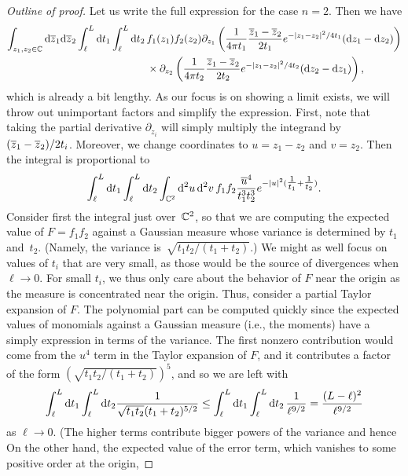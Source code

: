 \begin{proof}[Outline of proof]
Let us write the full expression for the case $n=2$.
Then we have
\begin{align*}
\int_{z_1,z_2 \in \mathbb C} {\rm d}\overline{z}_1{\rm d}\overline{z}_2 \int_{\ell}^L {\rm d} t_1 \int_{\ell}^L {\rm d} t_2\, 
& f_1(z_1)f_2(z_2) 
\partial_{z_1} \left(\frac{1}{4\pi t_1} \frac{\overline{z}_1 - \overline{z}_2}{2t_1} e^{-|z_1-z_2|^2/4t_1} ({\rm d} z_1 - {\rm d} z_2) \right)\\
& \times \partial_{z_2} \left(\frac{1}{4\pi t_2} \frac{\overline{z}_1 - \overline{z}_2}{2t_2} e^{-|z_1-z_2|^2/4t_2} ({\rm d} z_2 - {\rm d} z_1) \right),
\end{align*}
which is already a bit lengthy.
As our focus is on showing a limit exists, we will throw out unimportant factors and simplify the expression.
First, note that taking the partial derivative $\partial_{z_i}$ will simply multiply the integrand by $(\overline{z}_1 - \overline{z}_2)/2t_i$.
Moreover, we change coordinates to $u = z_1 - z_2$ and $v = z_2$. 
Then the integral is proportional to
\[
\int_{\ell}^L {\rm d} t_1 \int_{\ell}^L {\rm d} t_2\int_{\mathbb C^2} {\rm d}^2 u \, {\rm d}^2 v \, f_1 f_2 \frac{\overline{u}^4}{t_1^3 t_2^3} e^{-|u|^2(\tfrac{1}{t_1} + \tfrac{1}{t_2})}.
\]
Consider first the integral just over~$\mathbb C^2$,
so that we are computing the expected value of $F=f_1 f_2$ against a Gaussian measure 
whose variance is determined by $t_1$ and~$t_2$.
(Namely, the variance is~$\sqrt{t_1 t_2/(t_1+t_2)}$.)
We might as well focus on values of $t_i$ that are very small, as those would be the source of divergences when $\ell \to 0$.
For small $t_i$, we thus only care about the behavior of $F$ near the origin as the measure is concentrated near the origin.
Thus, consider a partial Taylor expansion of $F$.
The polynomial part can be computed quickly since the expected values of monomials against a Gaussian measure (i.e., the moments) have a simply expression in terms of the variance.
The first nonzero contribution would come from the $u^4$ term in the Taylor expansion of $F$,
and it contributes a factor of the form $(\sqrt{t_1 t_2/(t_1+t_2)})^5$,
and so we are left with
\[
\int_{\ell}^L {\rm d} t_1 \int_{\ell}^L {\rm d} t_2 \frac{1}{\sqrt{t_1t_2}(t_1 + t_2)^{5/2}} \leq \int_{\ell}^L {\rm d} t_1 \int_{\ell}^L {\rm d} t_2 \, \frac{1}{\ell^{9/2}} = \frac{(L- \ell)^2}{\ell^{9/2}}
\]
 as $\ell \to 0$.
(The higher terms contribute bigger powers of the variance and hence
On the other hand, the expected value of the error term, which vanishes to some positive order at the origin,
\end{proof}


